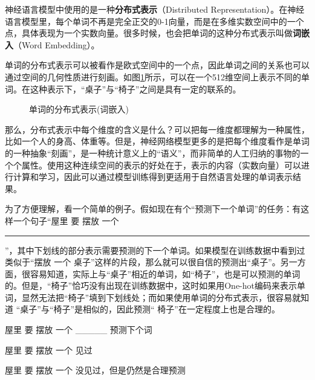 \parinterval  神经语言模型中使用的是一种{\small\sffamily\bfseries{分布式表示}}（Distributed Representation）。在神经语言模型里，每个单词不再是完全正交的0-1向量，而是在多维实数空间中的一个点，具体表现为一个实数向量。很多时候，也会把单词的这种分布式表示叫做{\small\sffamily\bfseries{词嵌入}}（Word Embedding）。

\parinterval  单词的分布式表示可以被看作是欧式空间中的一个点，因此单词之间的关系也可以通过空间的几何性质进行刻画。如图\ref{fig:5-65}所示，可以在一个512维空间上表示不同的单词。在这种表示下，``桌子''与``椅子''之间是具有一定的联系的。

\begin{figure}[htp]
\centering

\caption{单词的分布式表示(词嵌入) }
\label{fig:5-65}
\end{figure}

\parinterval  那么，分布式表示中每个维度的含义是什么？可以把每一维度都理解为一种属性，比如一个人的身高、体重等。但是，神经网络模型更多的是把每个维度看作是单词的一种抽象``刻画''，是一种统计意义上的``语义''，而非简单的人工归纳的事物的一个个属性。使用这种连续空间的表示的好处在于，表示的内容（实数向量）可以进行计算和学习，因此可以通过模型训练得到更适用于自然语言处理的单词表示结果。

\parinterval  为了方便理解，看一个简单的例子。假如现在有个``预测下一个单词''的任务：有这样一个句子``屋里 要 摆放 一个 \rule[-3pt]{1cm}{0.05em}''，其中下划线的部分表示需要预测的下一个单词。如果模型在训练数据中看到过类似于``摆放 一个 桌子''这样的片段，那么就可以很自信的预测出``桌子''。另一方面，很容易知道，实际上与``桌子''相近的单词，如``椅子''，也是可以预测的单词的。但是，``椅子''恰巧没有出现在训练数据中，这时如果用One-hot编码来表示单词，显然无法把``椅子''填到下划线处；而如果使用单词的分布式表示，很容易就知道 ``桌子''与``椅子''是相似的，因此预测`` 椅子''在一定程度上也是合理的。
\begin{example}
屋里 要 摆放 一个 \_\_\_\_\_ \hspace{0.5em} \quad \quad 预测下个词

\qquad \qquad \quad 屋里 要 摆放 一个{  }\hspace{0.5em}\quad\quad 见过

\qquad \qquad \quad 屋里 要 摆放 一个{ } \hspace{0.5em}\quad\quad 没见过，但是仍然是合理预测
\end{example}

